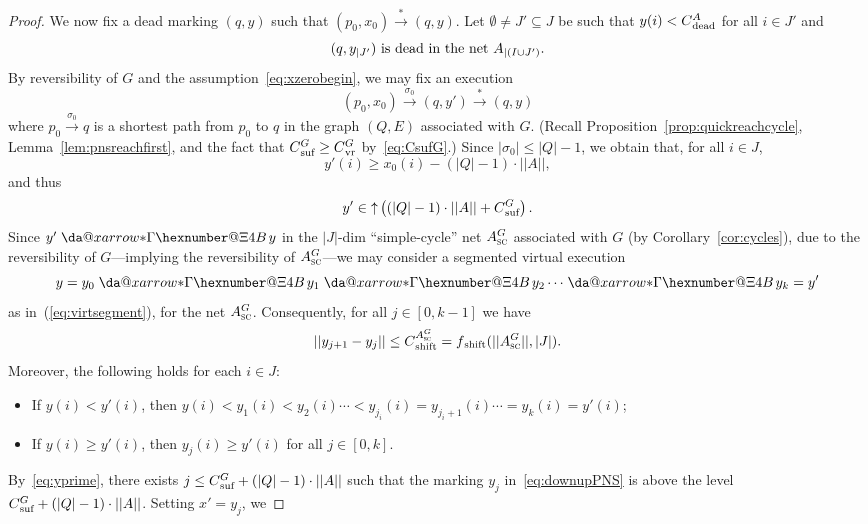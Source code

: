 \documentclass[11pt,a4paper]{amsart}
\makeatletter
\newcommand{\step}[1]{\mathrel{\xrightarrow{#1}}}
\newcommand{\reach}{\step{*}}
\newcommand{\virtual}[1]{\mathrel{\xdashrightarrow{#1}}\hspace{-0.3em}}
\newcommand{\vreach}{\virtual{*}}
\newcommand{\nnorm}[1]{||#1||}
\newcommand{\vr}{{}_\textnormal{vr}}
\newcommand{\upC}[1]{\mathop{\uparrow}#1}
\newcommand{\dead}{{}_\textnormal{dead}}
\newcommand{\suf}{{}_\textnormal{suf}}
\newcommand{\shift}{{}_\textnormal{shift}}
\newcommand{\ASC}{A_{\textsc{sc}}}
\newcommand{\restr}[1]{_{|{#1}}}
\newcommand*{\da@rightarrow}{\mathchar"0\hexnumber@\symAMSa 4B }
\newcommand*{\xdashrightarrow}[2][]{%
  \mathrel{%
    \mathpalette{\da@xarrow{#1}{#2}{}\da@rightarrow{\,}{}}{}%
  }%
}
\newcommand*{\da@xarrow}[7]{%
  \sbox0{$\ifx#7\scriptstyle\scriptscriptstyle\else\scriptstyle\fi#5#1#6\m@th$}%
  \sbox2{$\ifx#7\scriptstyle\scriptscriptstyle\else\scriptstyle\fi#5#2#6\m@th$}%
  \sbox4{$#7\dabar@\m@th$}%
  \dimen@=\wd0 %
  \ifdim\wd2 >\dimen@
    \dimen@=\wd2 %
  \fi
  \count@=2 %
  \def\da@bars{\dabar@\dabar@}%
  \@whiledim\count@\wd4<\dimen@\do{%
    \advance\count@\@ne
    \expandafter\def\expandafter\da@bars\expandafter{%
      \da@bars
      \dabar@ 
    }%
  }%
  \mathrel{#3}%
  \mathrel{%
    \mathop{\da@bars}\limits
    \ifx\\#1\\%
    \else
      _{\copy0}%
    \fi
    \ifx\\#2\\%
    \else
      ^{\copy2}%
    \fi
  }%
  \mathrel{#4}%
}
\let\origtextsc\textsc
\renewcommand{\textsc}[1]{\textnormal{\origtextsc{#1}}}
\theoremstyle{plain}
\theoremstyle{definition}
\theoremstyle{defC}
\theoremstyle{thmC}
\makeatother
\begin{document}
\begin{proof}
	We now fix a dead marking $(q,y)$ such that $(p_0,x_0)\reach
	(q,y)$. 
Let $\emptyset\neq J'\subseteq J$ be such that 
	$y(i)< C\dead^A$ for all $i\in J'$ and 
	\begin{equation}\label{eq:Jprime}
		\textnormal{$(q,y\restr{J'})$ is
		dead in the net $A\restr{(I\cup J')}$.}
	\end{equation}
	By reversibility of $G$ and the
	assumption~\eqref{eq:xzerobegin},
 we may fix an
	execution 
\begin{equation*}
(p_0,x_0)\step{\sigma_0}(q,y')\reach (q,y)
\end{equation*}
where  $p_0\step{\sigma_0}q$ is a shortest path from $p_0$ to $q$ in the
	graph $(Q,E)$ associated with $G$. 
	(Recall Proposition~\ref{prop:quickreachcycle},
	Lemma~\ref{lem:pnsreachfirst}, and the fact that $C\suf^G\geq
	C\vr^G$ by~\eqref{eq:CsufG}.)
Since $|\sigma_0|\leq |Q|-1$, we obtain that, for all $i\in J$,
	\begin{equation}\label{eq:yprimefirst}
		y'(i)\geq x_0(i)-(|Q|-1)\cdot\nnorm{A},
	\end{equation}
and thus
	\begin{equation}\label{eq:yprime}
		y'\in\upC{\left((|Q|-1)\cdot\nnorm{A}+C\suf^G\right)}.
	\end{equation}
Since $y'\vreach y$ in the
	$|J|$-dim ``simple-cycle'' net $\ASC^G$ associated with $G$
	(by Corollary~\ref{cor:cycles}), 
due to the reversibility of $G$---implying the reversibility of
	$\ASC^G$---we may consider a segmented
 virtual execution  
	\begin{equation}\label{eq:downupPNS}
y=y_0\vreach y_1\vreach y_2\cdots\vreach y_k=y'
	\end{equation}
	as in~(\ref{eq:virtsegment}), for the net $\ASC^G$.	
	Consequently, for all $j\in[0,k-1]$ we have
	\begin{equation}\label{eq:CshiftASC}
	\nnorm{y_{j+1}-y_j}\leq
		C\shift^{\ASC^G}=f\shift(\nnorm{\ASC^G},|J|).
\end{equation}
Moreover, 
 the following holds for each $i\in J$:
\begin{itemize}
\item If $y(i)<y'(i)$, then
	$y(i)<y_1(i)<y_2(i)\cdots <y_{j_i}(i)=y_{j_i+1}(i)\cdots
	=y_k(i)=y'(i)$;
\item	
If $y(i)\geq y'(i)$, then $y_j(i)\geq y'(i)$ for all
	$j\in[0,k]$.
	\end{itemize}
By~\eqref{eq:yprime}, 
	there exists $j\leq C\suf^G+(|Q|-1)\cdot\nnorm{A}$ such that 
	the marking $y_j$ in~\eqref{eq:downupPNS}
	is above the level $C\suf^G+(|Q|-1)\cdot\nnorm{A}$. Setting $x'=y_j$, we

\end{proof}
\end{document}
